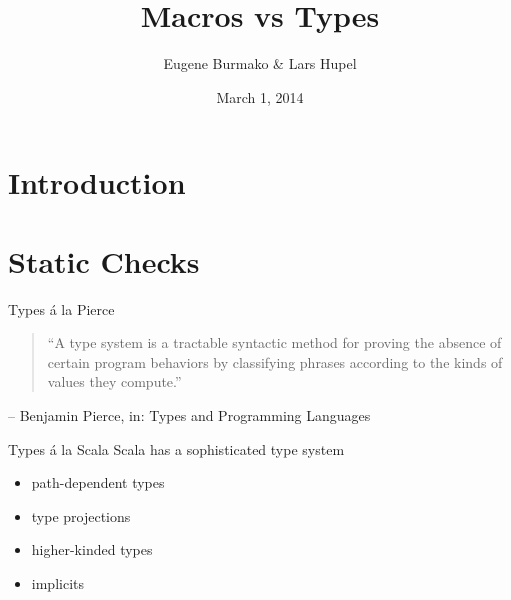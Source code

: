 \documentclass{beamer}
\begin{document}
  \title{Macros vs Types}
  \author{Eugene Burmako \& Lars Hupel}
  \date{March 1, 2014}

\begin{frame}
  \maketitle
\end{frame}

  \section*{Introduction}

\begin{frame}
\end{frame}

\begin{frame}
  \tableofcontents
\end{frame}

\AtBeginSection[]
{
  \begin{frame}
    \tableofcontents[currentsection]
  \end{frame}
}

  \section{Static Checks}

\begin{frame}{Types \'a la Pierce}
  \begin{quote}
    ``A type system is a tractable syntactic method for \alert<2>{proving the absence of certain program behaviors} by classifying phrases according to the kinds of values they compute.''
  \end{quote}
  \hfill -- Benjamin Pierce, in: Types and Programming Languages
\end{frame}

\begin{frame}{Types \'a la Scala}
  Scala has a sophisticated type system
  \begin{itemize}
    \item path-dependent types
    \item type projections
    \item higher-kinded types
    \item implicits
  \end{itemize}
\end{frame}
\end{document}
